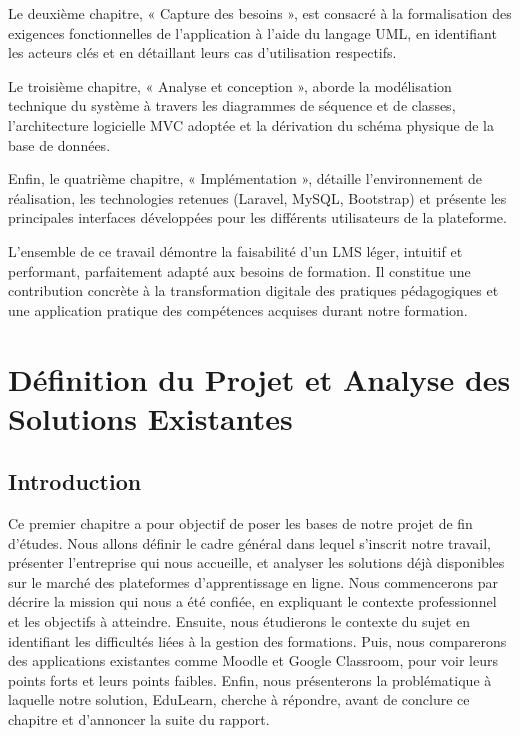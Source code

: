 \documentclass[12pt,a4paper]{report}
\begin{document}
Le deuxième chapitre, « Capture des besoins », est consacré à la formalisation des exigences fonctionnelles de l'application à l'aide du langage UML, en identifiant les acteurs clés et en détaillant leurs cas d'utilisation respectifs.

Le troisième chapitre, « Analyse et conception », aborde la modélisation technique du système à travers les diagrammes de séquence et de classes, l'architecture logicielle MVC adoptée et la dérivation du schéma physique de la base de données.

Enfin, le quatrième chapitre, « Implémentation », détaille l'environnement de réalisation, les technologies retenues (Laravel, MySQL, Bootstrap) et présente les principales interfaces développées pour les différents utilisateurs de la plateforme.

L'ensemble de ce travail démontre la faisabilité d'un LMS léger, intuitif et performant, parfaitement adapté aux besoins de formation. Il constitue une contribution concrète à la transformation digitale des pratiques pédagogiques et une application pratique des compétences acquises durant notre formation.

\clearpage

\chapter{Définition du Projet et Analyse des Solutions Existantes}

\section{Introduction}
Ce premier chapitre a pour objectif de poser les bases de notre projet de fin d'études. Nous allons définir le cadre général dans lequel s'inscrit notre travail, présenter l'entreprise qui nous accueille, et analyser les solutions déjà disponibles sur le marché des plateformes d'apprentissage en ligne. Nous commencerons par décrire la mission qui nous a été confiée, en expliquant le contexte professionnel et les objectifs à atteindre. Ensuite, nous étudierons le contexte du sujet en identifiant les difficultés liées à la gestion des formations. Puis, nous comparerons des applications existantes comme Moodle et Google Classroom, pour voir leurs points forts et leurs points faibles. Enfin, nous présenterons la problématique à laquelle notre solution, EduLearn, cherche à répondre, avant de conclure ce chapitre et d'annoncer la suite du rapport.
\end{document}
